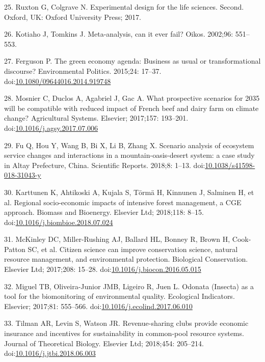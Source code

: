 \documentclass[10pt,letterpaper]{article}
\begin{document}
\hypertarget{ref-Ruxton2017}{}
25. Ruxton G, Colgrave N. Experimental design for the life sciences.
Second. Oxford, UK: Oxford University Press; 2017.

\hypertarget{ref-Kotiaho2002}{}
26. Kotiaho J, Tomkins J. Meta-analysis, can it ever fail? Oikos.
2002;96: 551--553.

\hypertarget{ref-Ferguson2015}{}
27. Ferguson P. The green economy agenda: Business as usual or
transformational discourse? Environmental Politics. 2015;24: 17--37.
doi:\href{https://doi.org/10.1080/09644016.2014.919748}{10.1080/09644016.2014.919748}

\hypertarget{ref-Mosnier2017}{}
28. Mosnier C, Duclos A, Agabriel J, Gac A. What prospective scenarios
for 2035 will be compatible with reduced impact of French beef and dairy
farm on climate change? Agricultural Systems. Elsevier; 2017;157:
193--201.
doi:\href{https://doi.org/10.1016/j.agsy.2017.07.006}{10.1016/j.agsy.2017.07.006}

\hypertarget{ref-Fu2018}{}
29. Fu Q, Hou Y, Wang B, Bi X, Li B, Zhang X. Scenario analysis of
ecosystem service changes and interactions in a mountain-oasis-desert
system: a case study in Altay Prefecture, China. Scientific Reports.
2018;8: 1--13.
doi:\href{https://doi.org/10.1038/s41598-018-31043-y}{10.1038/s41598-018-31043-y}

\hypertarget{ref-Karttunen2018}{}
30. Karttunen K, Ahtikoski A, Kujala S, Törmä H, Kinnunen J, Salminen H,
et al. Regional socio-economic impacts of intensive forest management, a
CGE approach. Biomass and Bioenergy. Elsevier Ltd; 2018;118: 8--15.
doi:\href{https://doi.org/10.1016/j.biombioe.2018.07.024}{10.1016/j.biombioe.2018.07.024}

\hypertarget{ref-McKinley2017}{}
31. McKinley DC, Miller-Rushing AJ, Ballard HL, Bonney R, Brown H,
Cook-Patton SC, et al. Citizen science can improve conservation science,
natural resource management, and environmental protection. Biological
Conservation. Elsevier Ltd; 2017;208: 15--28.
doi:\href{https://doi.org/10.1016/j.biocon.2016.05.015}{10.1016/j.biocon.2016.05.015}

\hypertarget{ref-Miguel2017}{}
32. Miguel TB, Oliveira-Junior JMB, Ligeiro R, Juen L. Odonata (Insecta)
as a tool for the biomonitoring of environmental quality. Ecological
Indicators. Elsevier; 2017;81: 555--566.
doi:\href{https://doi.org/10.1016/j.ecolind.2017.06.010}{10.1016/j.ecolind.2017.06.010}

\hypertarget{ref-Tilman2018}{}
33. Tilman AR, Levin S, Watson JR. Revenue-sharing clubs provide
economic insurance and incentives for sustainability in common-pool
resource systems. Journal of Theoretical Biology. Elsevier Ltd;
2018;454: 205--214.
doi:\href{https://doi.org/10.1016/j.jtbi.2018.06.003}{10.1016/j.jtbi.2018.06.003}
\end{document}
